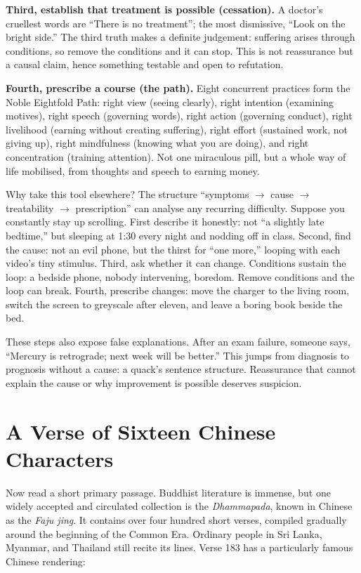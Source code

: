 \textbf{Third, establish that treatment is possible (cessation).} A doctor's cruellest words are ``There is no treatment''; the most dismissive, ``Look on the bright side.'' The third truth makes a definite judgement: suffering arises through conditions, so remove the conditions and it can stop. This is not reassurance but a causal claim, hence something testable and open to refutation.

\textbf{Fourth, prescribe a course (the path).} Eight concurrent practices form the Noble Eightfold Path: right view (seeing clearly), right intention (examining motives), right speech (governing words), right action (governing conduct), right livelihood (earning without creating suffering), right effort (sustained work, not giving up), right mindfulness (knowing what you are doing), and right concentration (training attention). Not one miraculous pill, but a whole way of life mobilised, from thoughts and speech to earning money.

Why take this tool elsewhere? The structure ``symptoms $\rightarrow$ cause $\rightarrow$ treatability $\rightarrow$ prescription'' can analyse any recurring difficulty. Suppose you constantly stay up scrolling. First describe it honestly: not ``a slightly late bedtime,'' but sleeping at 1:30 every night and nodding off in class. Second, find the cause: not an evil phone, but the thirst for ``one more,'' looping with each video's tiny stimulus. Third, ask whether it can change. Conditions sustain the loop: a bedside phone, nobody intervening, boredom. Remove conditions and the loop can break. Fourth, prescribe changes: move the charger to the living room, switch the screen to greyscale after eleven, and leave a boring book beside the bed.

These steps also expose false explanations. After an exam failure, someone says, ``Mercury is retrograde; next week will be better.'' This jumps from diagnosis to prognosis without a cause: a quack's sentence structure. Reassurance that cannot explain the cause or why improvement is possible deserves suspicion.

\section{A Verse of Sixteen Chinese Characters}
Now read a short primary passage. Buddhist literature is immense, but one widely accepted and circulated collection is the \textit{Dhammapada}, known in Chinese as the \textit{Faju jing}. It contains over four hundred short verses, compiled gradually around the beginning of the Common Era. Ordinary people in Sri Lanka, Myanmar, and Thailand still recite its lines. Verse 183 has a particularly famous Chinese rendering:

